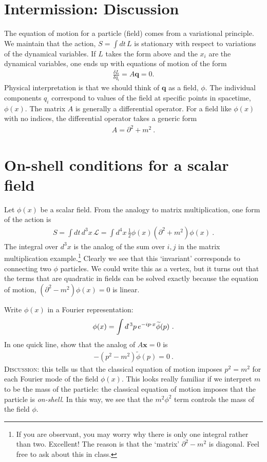 \documentclass[12pt]{article}
\numberwithin{equation}{section}    %
\renewcommand{\tilde}{\widetilde}   %
\renewcommand{\vec}[1]{\mathbf{#1}} %
\newcommand{\dbar}{d\mkern-6mu\mathchar'26}    %
\begin{document}
\section*{Intermission: Discussion}

The equation of motion for a particle (field) comes from a variational principle. We maintain that the action, $S=\int dt\, L$ is stationary with respect to variations of the dynamical variables. If $L$ takes the form above and the $x_i$ are the dynamical variables, one ends up with equations of motion of the form
\begin{align}
	\frac{\delta L}{\delta q_i} = A\vec{q} = 0  .
\end{align}
Physical interpretation is that we should think of $\vec{q}$ as a field, $\phi$. The individual components $q_i$ correspond to values of the field at specific points in spacetime, $\phi(x)$. The matrix $A$ is generally a differential operator. For a field like $\phi(x)$ with no indices, the differential operator takes a generic form
\begin{align}
	A = \partial^2 + m^2 \ .
\end{align}


\section{On-shell conditions for a scalar field}

Let $\phi(x)$ be a scalar field. From the analogy to matrix multiplication, one form of the action is 
\begin{align}
	 S = \int dt\, d^3x \, \mathcal L = \int d^4x \, \frac{1}{2}\phi(x) \left(\partial^2 + m^2\right) \phi(x) \ .
\end{align}
The integral over $d^3x$ is the analog of the sum over $i,j$ in the matrix multiplication example.\footnote{If you are observant, you may worry why there is only one integral rather than two. Excellent! The reason is that the `matrix' $\partial^2 - m^2$ is diagonal. Feel free to ask about this in class.} Clearly we see that this `invariant' corresponds to connecting two $\phi$ particles. We could write this as a vertex, but it turns out that the terms that are quadratic in fields can be solved exactly because the equation of motion, $(\partial^2 - m^2)\phi(x) = 0$ is linear.

Write $\phi(x)$ in a Fourier representation:
\begin{align}
	\phi(x) = \int \dbar^3p \, e^{-ip\cdot x} \tilde \phi(p) \ .
\end{align}
In one quick line, show that the analog of $A\vec{x} = 0$ is
\begin{align}
	-(p^2 - m^2)\tilde\phi(p) = 0 \ .
\end{align}
\textsc{Discussion}: this tells us that the classical equation of motion imposes $p^2 = m^2$ for each Fourier mode of the field $\phi(x)$. This looks really familiar if we interpret $m$ to be the mass of the particle: the classical equation of motion imposes that the particle is \emph{on-shell}. In this way, we see that the $m^2 \phi^2$ term controls the mass of the field $\phi$.
\end{document}
